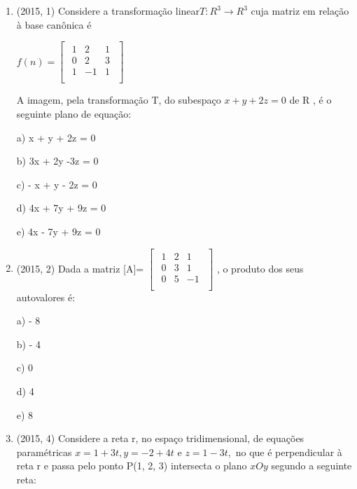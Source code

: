 \documentclass{article}
\begin{document}
\begin{enumerate}
\item (2015, 1) Considere a transformação linear$ T : R^3 \rightarrow R^3$
cuja matriz em relação à base canônica é\newline

$
f(n) = \left [ \begin{matrix} 
    \begin{array}{cccc}
    1 & 2 & 1 \\
    0 & 2 & 3 \\
    1 & -1 & 1 \\
\end{array}
\end{matrix} \right ]$ \newline

A imagem, pela transformação T, do subespaço $ x + y + 2z = 0 $ de R , é o seguinte plano de equação:\newline

a) x + y + 2z = 0

b) 3x + 2y -3z = 0

c) - x + y - 2z = 0

d) 4x + 7y + 9z = 0

e) 4x - 7y + 9z = 0\newline



\item (2015, 2) Dada a matriz [A]=
$
\left [ \begin{matrix} 
    \begin{array}{cccc}
    1 & 2 & 1 \\
    0 & 3 & 1 \\
    0 & 5 & -1 \\
\end{array}
\end{matrix} \right ]$ , o produto dos seus autovalores é:\newline

a) - 8

b) - 4

c) 0

d) 4

e) 8\newline



\item (2015, 4) Considere a reta r, no espaço tridimensional, de equações paramétricas $x=1+ 3t ,
y=-2+ 4t$ e $z=1-3t ,$ no que é perpendicular à reta r e passa pelo ponto P(1, 2, 3) intersecta o plano $x O y$ segundo a seguinte reta:\newline


\end{enumerate}
\end{document}
